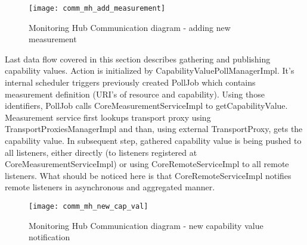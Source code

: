 \begin{figure}[ht]
  \centering
  \texttt{[image: comm\_mh\_add\_measurement]}
  \caption{Monitoring Hub Communication diagram - adding new measurement}
  \label{fig:comm_mh_add_measurement}
\end{figure}

Last data flow covered in this section describes gathering and publishing capability values. Action is initialized by
CapabilityValuePollManagerImpl. It's internal scheduler triggers previously created PollJob which contains measurement
definition (URI's of resource and capability). Using those identifiers, PollJob calls CoreMeasurementServiceImpl to
getCapabilityValue. Measurement service first lookups transport proxy using TransportProxiesManagerImpl and than, using
external TransportProxy, gets the capability value. In subsequent step, gathered capability value is being pushed to all
listeners, either directly (to listeners registered at CoreMeasurementServiceImpl) or using CoreRemoteServiceImpl to all
remote listeners. What should be noticed here is that CoreRemoteServiceImpl notifies remote listeners in asynchronous
and aggregated manner.

\begin{figure}[ht]
  \centering
  \texttt{[image: comm\_mh\_new\_cap\_val]}
  \caption{Monitoring Hub Communication diagram - new capability value notification}
  \label{fig:comm_new_cap_val}
\end{figure}

\pagebreak